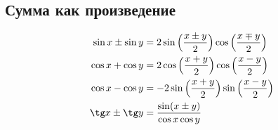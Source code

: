 \subsection*{Сумма как произведение}

\begin{align*}
  \sin x \pm \sin y &= 2 \sin \Big( \frac{x \pm y}{2} \Big) \cos \Big( \frac{x \mp y}{2} \Big)\\
  \cos x + \cos y &= 2 \cos \Big( \frac{x + y}{2} \Big) \cos \Big( \frac{x - y}{2} \Big)\\
  \cos x - \cos y &= -2 \sin \Big( \frac{x + y}{2} \Big) \sin \Big( \frac{x - y}{2} \Big)\\
  \tg x \pm \tg y &= \frac{ \sin(x \pm y) }{ \cos x \cos y}
\end{align*}